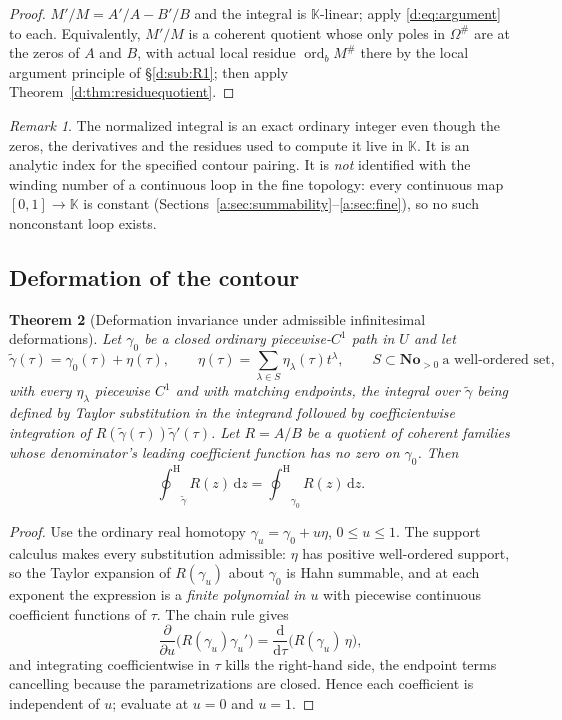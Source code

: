 \documentclass[11pt,a4paper]{article}
\numberwithin{equation}{section}
\newtheorem{theorem}{Theorem}[section]
\theoremstyle{definition}
\theoremstyle{remark}
\newtheorem{remark}[theorem]{Remark}
\theoremstyle{plain}
\newcommand{\K}{\mathbb K}
\newcommand{\No}{\mathbf{No}}
\DeclareMathOperator{\ord}{ord}
\newcommand{\tm}{t}
\newcommand{\halo}[1]{#1^{\#}}
\newcommand{\ev}[1]{#1^{\#}}
\newcommand{\ointH}{{\oint^{\mathrm H}}}
\newcommand{\dd}{\mathrm d}
\begin{document}
\begin{proof}
$M'/M=A'/A-B'/B$ and the integral is $\K$-linear; apply
\eqref{d:eq:argument} to each.  Equivalently, $M'/M$ is a coherent
quotient whose only poles in $\halo\Omega$ are at the zeros of $A$ and
$B$, with actual local residue $\ord_b\ev M$ there by the local
argument principle of \S\ref{d:sub:R1}; then apply
Theorem~\ref{d:thm:residuequotient}.
\end{proof}

\begin{remark}
The normalized integral is an exact ordinary integer even though the
zeros, the derivatives and the residues used to compute it live in
$\K$.  It is an analytic index for the specified contour pairing.  It is
\emph{not} identified with the winding number of a continuous loop in
the fine topology: every continuous map $[0,1]\to\K$ is constant
(Sections~\ref{a:sec:summability}--\ref{a:sec:fine}), so no such nonconstant loop exists.
\end{remark}

\subsection{Deformation of the contour}
\label{d:sub:deformation}

\begin{theorem}[Deformation invariance under admissible infinitesimal deformations]
\label{d:thm:deformation}
Let $\gamma_0$ be a closed ordinary piecewise-$C^1$ path in $U$ and let
\[
 \widetilde\gamma(\tau)=\gamma_0(\tau)+\eta(\tau),
 \qquad \eta(\tau)=\sum_{\lambda\in S}\eta_\lambda(\tau)\tm^{\lambda},
 \qquad S\subset\No_{>0}\ \text{a well-ordered set},
\]
with every $\eta_\lambda$ piecewise $C^1$ and with matching endpoints,
the integral over $\widetilde\gamma$ being defined by Taylor
substitution in the integrand followed by coefficientwise integration of
$R(\widetilde\gamma(\tau))\widetilde\gamma'(\tau)$.  Let $R=A/B$ be a
quotient of coherent families whose denominator's leading coefficient
function has no zero on $\gamma_0$.  Then
\[
 \ointH_{\widetilde\gamma}R(z)\,\dd z=\ointH_{\gamma_0}R(z)\,\dd z .
\]
\end{theorem}

\begin{proof}
Use the ordinary real homotopy $\gamma_u=\gamma_0+u\eta$, $0\le u\le1$.
The support calculus makes every substitution admissible: $\eta$ has
positive well-ordered support, so the Taylor expansion of
$R(\gamma_u)$ about $\gamma_0$ is Hahn summable, and at each exponent
the expression is a \emph{finite polynomial in $u$} with piecewise
continuous coefficient functions of $\tau$.  The chain rule gives
\[
 \frac{\partial}{\partial u}\bigl(R(\gamma_u)\gamma_u'\bigr)
  =\frac{\dd}{\dd \tau}\bigl(R(\gamma_u)\,\eta\bigr),
\]
and integrating coefficientwise in $\tau$ kills the right-hand side,
the endpoint terms cancelling because the parametrizations are closed.
Hence each coefficient is independent of $u$; evaluate at $u=0$ and
$u=1$.
\end{proof}
\end{document}

